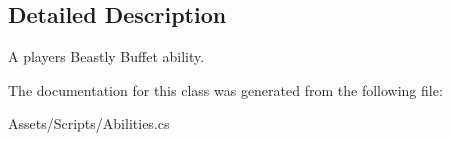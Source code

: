 \subsection{Detailed Description}
A player\textquotesingle{}s Beastly Buffet ability. 



The documentation for this class was generated from the following file\+:\begin{DoxyCompactItemize}
\item 
Assets/\+Scripts/Abilities.\+cs\end{DoxyCompactItemize}
